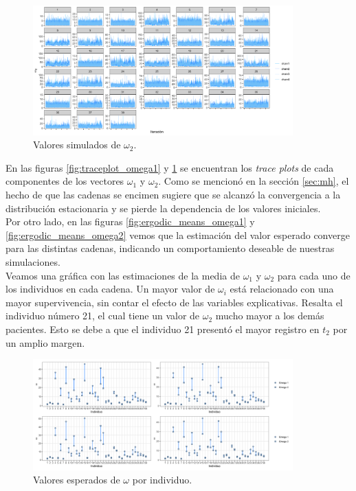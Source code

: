 \documentclass[11pt,a4paper]{article}
\begin{document}
\begin{figure}
\centering\includegraphics[width=10cm]{traceplots_omega2.png}
\caption{Valores simulados de $\omega_2$.}
\label{fig:traceplot_omega2}
\end{figure}

En las figuras \ref{fig:traceplot_omega1} y \ref{fig:traceplot_omega2} se encuentran los \textit{trace plots} de cada componentes de los vectores $\omega_1$ y $\omega_2$. Como se mencionó en la sección \ref{sec:mh}, el hecho de que las cadenas se encimen sugiere que se alcanzó la convergencia a la distribución estacionaria y se pierde la dependencia de los valores iniciales.\\

Por otro lado, en las figuras \ref{fig:ergodic_means_omega1} y \ref{fig:ergodic_means_omega2} vemos que la estimación del valor esperado converge para las distintas cadenas, indicando un comportamiento deseable de nuestras simulaciones.\\

Veamos una gráfica con las estimaciones de la media de $\omega_1$ y $\omega_2$ para cada uno de los individuos en cada cadena. Un mayor valor de $\omega_i$ está relacionado con una mayor supervivencia, sin contar el efecto de las variables explicativas. Resalta el individuo número 21, el cual tiene un valor de $\omega_2$ mucho mayor a los demás pacientes. Esto se debe a que el individuo 21 presentó el mayor registro en $t_2$ por un amplio margen.\\

\begin{figure}
\centering\includegraphics[width=10cm]{frailties.png}
\caption{Valores esperados de $\omega$ por individuo.}
\label{fig:frailties}
\end{figure}
\end{document}

